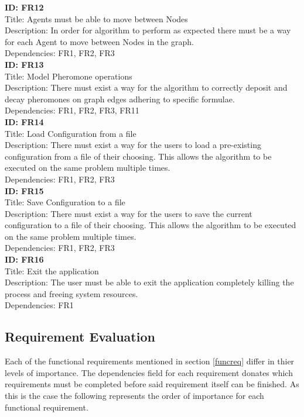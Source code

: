 \documentclass[10pt,a4paper]{article}
\begin{document}
\noindent
\textbf{ID: FR12}\\
Title: Agents must be able to move between Nodes\\
Description: In order for algorithm to perform as expected there must be a way for each Agent to move between Nodes in the graph. \\
Dependencies: FR1, FR2, FR3
\\

\noindent
\textbf{ID: FR13}\\
Title: Model Pheromone operations\\
Description: There must exist a way for the algorithm to correctly deposit and decay pheromones on graph edges adhering to specific formulae. \\
Dependencies: FR1, FR2, FR3, FR11
\\

\noindent
\textbf{ID: FR14}\\
Title: Load Configuration from a file\\
Description: There must exist a way for the users to load a pre-existing configuration from a file of their choosing. This allows the algorithm to be executed on the same problem multiple times. \\
Dependencies: FR1, FR2, FR3
\\

\noindent
\textbf{ID: FR15}\\
Title: Save Configuration to a file\\
Description: There must exist a way for the users to save the current configuration to a file of their choosing. This allows the algorithm to be executed on the same problem multiple times. \\
Dependencies: FR1, FR2, FR3
\\

\noindent
\textbf{ID: FR16}\\
Title: Exit the application\\
Description: The user must be able to exit the application completely killing the process and freeing system resources. \\
Dependencies: FR1
\clearpage
\subsection{Requirement Evaluation}

Each of the functional requirements mentioned in section \ref{funcreq} differ in thier levels of importance. The dependencies field for each requirement donates which requirements must be completed before said requirement itself can be finished. As this is the case the following represents the order of importance for each functional requirement.
\end{document}
